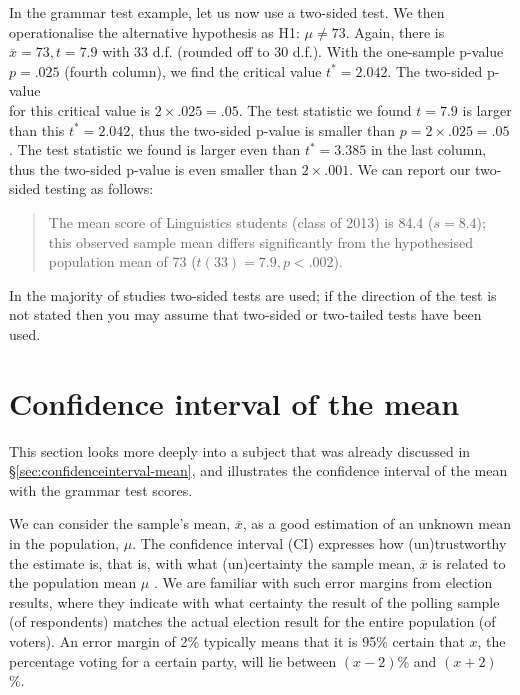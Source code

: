 \documentclass[
]{book}
\begin{document}
In the grammar test example, let us now use a two-sided test. We
then operationalise the alternative hypothesis as H1: \(\mu \ne 73\).
Again, there is \(\overline{x}=73, t=7.9\) with 33 d.f. (rounded off to 30 d.f.).
With the one-sample p-value \(p=.025\) (fourth column), we find
the critical value \(t^*=2.042\). The two-sided p-value\\
for this critical value is \(2 \times .025 = .05\). The test statistic we found
\(t=7.9\) is larger than this \(t^*=2.042\), thus the two-sided
p-value is smaller than \(p=2\times.025=.05\). The test statistic we found
is larger even than \(t^*=3.385\) in the last column,
thus the two-sided p-value is even smaller than
\(2\times.001\). We can report our two-sided testing as
follows:

\begin{quote}
The mean score of Linguistics students (class of 2013) is
84.4 (\(s=8.4\)); this observed sample mean differs significantly from the hypothesised
population mean of 73 (\(t(33)=7.9, p<.002\)).
\end{quote}

In the majority of studies two-sided tests are used; if the direction
of the test is not stated then you may assume that two-sided or two-tailed tests
have been used.

\section{Confidence interval of the mean}\label{sec:t-confidenceinterval-mean}

This section looks more deeply into a subject that was already discussed in
§\ref{sec:confidenceinterval-mean}, and illustrates the confidence interval
of the mean with the grammar test scores.

We can consider the sample's mean, \(\overline{x}\), as a good estimation
of an unknown mean in the population,
\(\mu\). The confidence interval (CI) expresses how
(un)trustworthy the estimate is, that is,
with what (un)certainty the sample mean, \(\overline{x}\) is related to the population mean \(\mu\) \citep{Cumm12}.
We are familiar with such error margins
from election results, where they indicate with what certainty the result
of the polling sample (of respondents) matches the actual election result for the entire population (of voters). An
error margin of 2\% typically means that it is 95\% certain that \(x\), the percentage voting
for a certain party, will lie between \((x-2)\)\% and \((x+2)\)\%.
\end{document}
